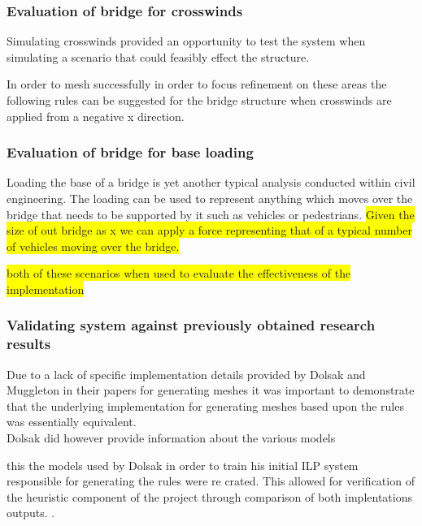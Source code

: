 \documentclass{article}
\begin{document}
\subsubsection{Evaluation of bridge for crosswinds}
Simulating crosswinds provided an opportunity  to test the system when simulating a scenario that could feasibly effect the structure.

\cite{CrosswindsOnSuspensionBridges}

In order to mesh successfully in order to focus refinement on these areas the following rules can be suggested for the bridge structure when crosswinds are applied from a negative x direction.



\subsubsection{Evaluation of bridge for base loading}
Loading the base of a bridge is yet another typical analysis conducted within civil engineering. The loading can be used to represent anything which moves over the bridge that needs to be supported by it such as vehicles or pedestrians. 
\colorbox{yellow}{Given the size of out bridge as x we  can apply a force representing that of a typical number of vehicles moving over the bridge.} 



\colorbox{yellow}{both of these scenarios when used to evaluate the effectiveness of the implementation}

\subsubsection{Validating system against previously obtained research results}
Due to a lack of specific implementation details provided by Dolsak and Muggleton in their papers for generating meshes it was important to demonstrate that the underlying implementation for generating meshes based upon the rules was essentially equivalent. \\ 


Dolsak did however provide information about the various models 

this the models used by Dolsak in order to train his initial ILP system responsible for generating the rules were re crated. This allowed for verification of the heuristic component of the project through comparison of both implentations outputs. \cite{DolsakPaper91}.
\end{document}

